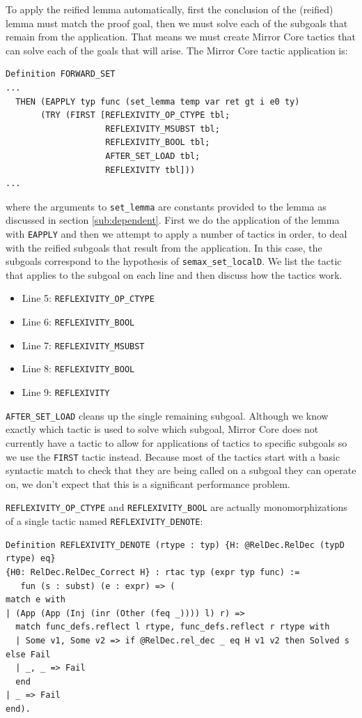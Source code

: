 \documentclass{puthesis}
\begin{document}
To apply the reified lemma automatically, first the conclusion of the
(reified) lemma must match the proof goal, then we must solve each of
the subgoals that remain from the application. That means we must
create Mirror Core tactics that can solve each of the goals that will
arise. The Mirror Core tactic application is:
\pagebreak
\begin{lstlisting}
Definition FORWARD_SET 
...
  THEN (EAPPLY typ func (set_lemma temp var ret gt i e0 ty)
       (TRY (FIRST [REFLEXIVITY_OP_CTYPE tbl;
                    REFLEXIVITY_MSUBST tbl; 
                    REFLEXIVITY_BOOL tbl;
                    AFTER_SET_LOAD tbl;
                    REFLEXIVITY tbl]))
...
\end{lstlisting}

where the arguments to \lstinline|set_lemma| are constants provided to
the lemma as discussed in section \ref{sub:dependent}.  First we do
the application of the lemma with \lstinline|EAPPLY| and then we
attempt to apply a number of tactics in order, to deal with the
reified subgoals that result from the application. In this case, the
subgoals correspond to the hypothesis of
\lstinline|semax_set_localD|. We list the tactic that applies to the
subgoal on each line and then discuss how the tactics work.

\begin{itemize}
\item Line 5: \lstinline|REFLEXIVITY_OP_CTYPE|
\item Line 6: \lstinline|REFLEXIVITY_BOOL|
\item Line 7: \lstinline|REFLEXIVITY_MSUBST|
\item Line 8: \lstinline|REFLEXIVITY_BOOL|
\item Line 9: \lstinline|REFLEXIVITY|
\end{itemize}

\lstinline|AFTER_SET_LOAD| cleans up the single remaining subgoal.
Although we know exactly which tactic is used to solve which subgoal,
Mirror Core does not currently have a tactic to allow for applications
of tactics to specific subgoals so we use the \lstinline|FIRST| tactic
instead. Because most of the tactics start with a basic syntactic
match to check that they are being called on a subgoal they can
operate on, we don't expect that this is a significant performance
problem.

\lstinline|REFLEXIVITY_OP_CTYPE| and \lstinline|REFLEXIVITY_BOOL| are
actually monomorphizations of a single tactic named
\lstinline|REFLEXIVITY_DENOTE|:
\pagebreak
\begin{lstlisting}
Definition REFLEXIVITY_DENOTE (rtype : typ) {H: @RelDec.RelDec (typD rtype) eq}
{H0: RelDec.RelDec_Correct H} : rtac typ (expr typ func) := 
   fun (s : subst) (e : expr) => (
match e with
| (App (App (Inj (inr (Other (feq _)))) l) r) =>
  match func_defs.reflect l rtype, func_defs.reflect r rtype with
  | Some v1, Some v2 => if @RelDec.rel_dec _ eq H v1 v2 then Solved s else Fail
  | _, _ => Fail
  end
| _ => Fail
end).
\end{lstlisting}
\end{document}
